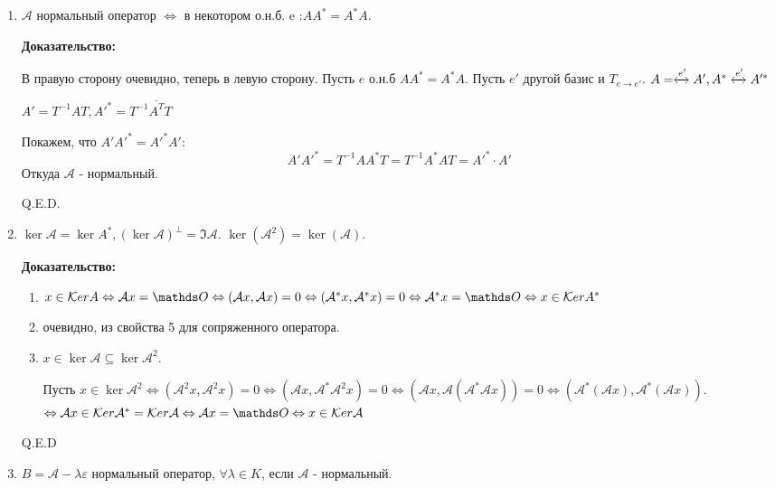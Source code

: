 \begin{enumerate}
    \item $\mathcal{A}$ нормальный оператор $\Leftrightarrow$ в некотором о.н.б. e :$A A^* = A^*A$.

    \textbf{Доказательство:}

    В правую сторону очевидно, теперь в левую сторону. Пусть $e$ о.н.б $A A^* =A^* A$. Пусть $e'$ другой базис и $T_{e\rightarrow{}e'}$. $A =\xleftrightarrow[]{e'}A', A^* \xleftrightarrow[]{e'}A'^*$

    $A' = T^{-1}AT, A'^* = T^{-1}\overline{A^T}T$

    Покажем, что $A'A'^* = A'^*A':$
    $$A'A'^* = T^{-1}A A^*T = T^{-1}A^*AT = A'^*\cdot A'$$
    Откуда $\mathcal{A}$ - нормальный.

    \hfill Q.E.D.

    \item $\ker \mathcal{A} = \ker A^*,(\ker \mathcal{A})^\perp = \Im \mathcal{A}$. $\ker (\mathcal{A}^2)=\ker (\mathcal{A})$.

    \textbf{Доказательство:}

    \begin{enumerate}
        \item $x\in \ker A \Leftrightarrow \mathcal{A}x = \zero \Leftrightarrow (\mathcal{A}x, \mathcal{A}x) = 0 \Leftrightarrow (\mathcal{A}^*x, \mathcal{A}^*x) = 0 \Leftrightarrow \mathcal{A}^*x = \zero \Leftrightarrow x\in \ker A^*$

        \item очевидно, из свойства 5 для сопряженного оператора.
        \item $x\in \ker \mathcal{A}\subseteq \ker \mathcal{ A}^2$.

        Пусть $x \in \ker \mathcal{A}^2 \Leftrightarrow (\mathcal{A}^2 x, \mathcal{A}^2x) = 0 \Leftrightarrow (\mathcal{A}x, \mathcal{A}^* \mathcal{A}^2x) = 0 \Leftrightarrow (\mathcal{A}x, \mathcal{A}(\mathcal{A}^*\mathcal{A}x)) = 0 \Leftrightarrow (\mathcal{A}^*(\mathcal{A}x),\mathcal{A}^*(\mathcal{A}x))$.
        $\Leftrightarrow \mathcal{A}x \in \ker \mathcal{A}^* =\ker \mathcal{A} \Leftrightarrow \mathcal{A}x = \zero \Leftrightarrow x \in \ker \mathcal{A}$
    \end{enumerate}

    \hfill Q.E.D

    \item   $B = \mathcal{A}-\lambda \varepsilon$ нормальный оператор, $\forall \lambda \in K$, если $\mathcal{A}$ - нормальный.


\end{enumerate}
